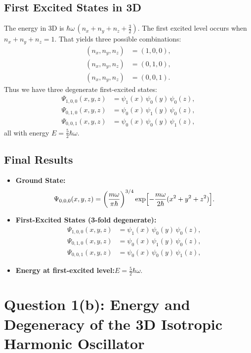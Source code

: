 \documentclass[12pt]{article}
\begin{document}
\subsection*{First Excited States in 3D}
\noindent
The energy in 3D is \(\hbar\omega\,(n_x + n_y + n_z + \tfrac32)\). The first excited level occurs when \(n_x + n_y + n_z = 1\). That yields three possible combinations:
\begin{align*}
(n_x,n_y,n_z)&=(1,0,0),\\
(n_x,n_y,n_z)&=(0,1,0),\\
(n_x,n_y,n_z)&=(0,0,1).
\end{align*}
Thus we have three degenerate first-excited states:
\begin{align*}
\Psi_{1,0,0}(x,y,z) &= \psi_1(x)\,\psi_0(y)\,\psi_0(z),\\
\Psi_{0,1,0}(x,y,z) &= \psi_0(x)\,\psi_1(y)\,\psi_0(z),\\
\Psi_{0,0,1}(x,y,z) &= \psi_0(x)\,\psi_0(y)\,\psi_1(z),
\end{align*}
all with energy \(E = \tfrac{5}{2}\hbar\omega\).

\subsection*{Final Results}
\begin{itemize}
\item \textbf{Ground State:}
\begin{equation}
\Psi_{0,0,0}(x,y,z) = \biggl(\frac{m\omega}{\pi\hbar}\biggr)^{3/4}\exp\Bigl[-\frac{m\omega}{2\hbar}(x^2 + y^2 + z^2)\Bigr].
\end{equation}
\item \textbf{First-Excited States (3-fold degenerate):}
\begin{align*}
\Psi_{1,0,0}(x,y,z) &= \psi_1(x)\,\psi_0(y)\,\psi_0(z),\\
\Psi_{0,1,0}(x,y,z) &= \psi_0(x)\,\psi_1(y)\,\psi_0(z),\\
\Psi_{0,0,1}(x,y,z) &= \psi_0(x)\,\psi_0(y)\,\psi_1(z),
\end{align*}
\item \textbf{Energy at first-excited level:}\quad \(E = \frac{5}{2}\hbar\omega.\)
\end{itemize}





\section*{Question 1(b): Energy and Degeneracy of the 3D Isotropic Harmonic Oscillator}
\end{document}
